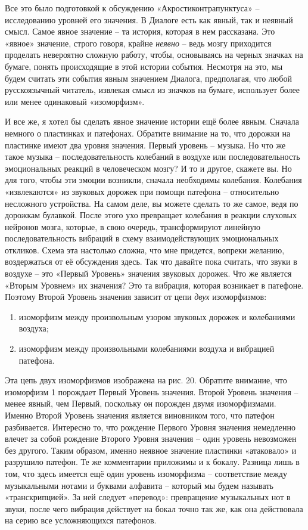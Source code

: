 \documentclass[../main.tex]{subfiles}
\begin{document}
Все это было подготовкой к обсуждению «Акростиконтрапунктуса» \--- исследованию уровней его значения. В Диалоге есть как явный, так и неявный смысл. Самое явное значение \--- та история, которая в нем рассказана. Это «явное» значение, строго говоря, крайне \emph{неявно} \--- ведь мозгу приходится проделать невероятно сложную работу, чтобы, основываясь на черных значках на бумаге, понять происходящие в этой истории события. Несмотря на это, мы будем считать эти события явным значением Диалога, предполагая, что любой русскоязычный читатель, извлекая смысл из значков на бумаге, использует более или менее одинаковый «изоморфизм».

И все же, я хотел бы сделать явное значение истории ещё более явным. Сначала немного о пластинках и патефонах. Обратите внимание на то, что дорожки на пластинке имеют два уровня значения. Первый уровень \--- музыка. Но что же такое музыка \--- последовательность колебаний в воздухе или последовательность эмоциональных реакций в человеческом мозгу? И то и другое, скажете вы. Но для того, чтобы эти эмоции возникли, сначала необходимы колебания. Колебания «извлекаются» из звуковых дорожек при помощи патефона \--- относительно несложного устройства. На самом деле, вы можете сделать то же самое, ведя по дорожкам булавкой. После этого ухо превращает колебания в реакции слуховых нейронов мозга, которые, в свою очередь, трансформируют линейную последовательность вибраций в схему взаимодействующих эмоциональных откликов. Схема эта настолько сложна, что мне придется, вопреки желанию, воздержаться от её обсуждения здесь. Так что давайте пока считать, что звуки в воздухе \--- это «Первый Уровень» значения звуковых дорожек. Что же является «Вторым Уровнем» их значения? Это та вибрация, которая возникает в патефоне. Поэтому Второй Уровень значения зависит от цепи \emph{двух} изоморфизмов:

\begin{enumerate}[label=(\arabic*), noitemsep, topsep=6pt]
    \item изоморфизм между произвольным узором звуковых дорожек и колебаниями воздуха;
    \item изоморфизм между произвольными колебаниями воздуха и вибрацией патефона.
\end{enumerate}

Эта цепь двух изоморфизмов изображена на рис. 20. Обратите внимание, что изоморфизм 1 порождает Первый Уровень значения. Второй Уровень значения \--- менее явный, чем Первый, поскольку он порожден двумя изоморфизмами. Именно Второй Уровень значения является виновником того, что патефон разбивается. Интересно то, что рождение Первого Уровня значения немедленно влечет за собой рождение Второго Уровня значения \--- один уровень невозможен без другого. Таким образом, именно неявное значение пластинки «атаковало» и разрушило патефон. Те же комментарии приложимы и к бокалу. Разница лишь в том, что здесь имеется ещё один уровень изоморфизма \--- соответствие между музыкальными нотами и буквами алфавита \--- который мы будем называть «транскрипцией». За ней следует «перевод»: превращение музыкальных нот в звуки, после чего вибрация действует на бокал точно так же, как она действовала на серию все усложняющихся патефонов.
\end{document}
